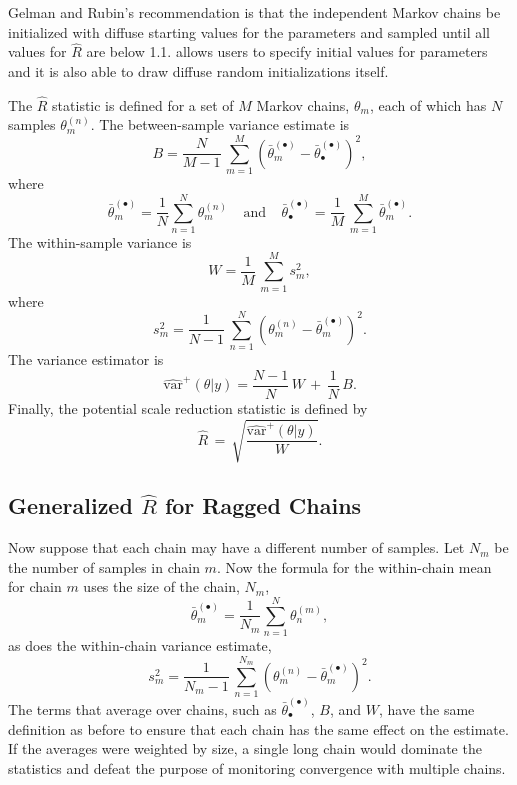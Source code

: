 Gelman and Rubin's recommendation is that the independent Markov
chains be initialized with diffuse starting values for the parameters
and sampled until all values for $\hat{R}$ are below 1.1.  \Stan
allows users to specify initial values for parameters and it is also
able to draw diffuse random initializations itself.

The $\hat{R}$ statistic is defined for a set of $M$ Markov chains,
$\theta_m$, each of which has $N$ samples $\theta^{(n)}_m$.  The
between-sample variance estimate is
\[
B
= \frac{N}{M-1} \, \sum_{m=1}^M (\bar{\theta}^{(\bullet)}_{m} - \bar{\theta}^{(\bullet)}_{\bullet})^2,
\]
%
where
%
\[
\bar{\theta}_m^{(\bullet)}
= \frac{1}{N} \sum_{n = 1}^N \theta_m^{(n)}
\ \ \ \ \
\mbox{and}
\ \ \ \ \
\bar{\theta}^{(\bullet)}_{\bullet}
= \frac{1}{M} \, \sum_{m=1}^M \bar{\theta}_m^{(\bullet)}.
\]
%
The within-sample variance is
\[
W
= \frac{1}{M} \, \sum_{m=1}^M s_m^2,
\]
where
\[
s_m^2 = \frac{1}{N-1} \, \sum_{n=1}^N (\theta^{(n)}_m - \bar{\theta}^{(\bullet)}_m)^2.
\]
%
The variance estimator is
\[
\widehat{\mbox{var}}^{+}\!(\theta|y)
= \frac{N-1}{N}\, W \, + \, \frac{1}{N} \, B.
\]
%
Finally, the potential scale reduction statistic is defined by
\[
\hat{R}
\, = \,
\sqrt{\frac{\widehat{\mbox{var}}^{+}\!(\theta|y)}{W}}.
\]

\subsection{Generalized $\hat{R}$ for Ragged Chains}

Now suppose that each chain may have a different number of samples.
Let $N_m$ be the number of samples in chain $m$.  Now the formula for
the within-chain mean for chain $m$ uses the size of the chain, $N_m$,
\[
\bar{\theta}_m^{(\bullet)}
= \frac{1}{N_m} \sum_{n = 1}^N \theta^{(m)}_n,
\]
as does the within-chain variance estimate,
\[
s_m^2 = \frac{1}{N_m-1} \, \sum_{n=1}^{N_m} (\theta^{(n)}_m - \bar{\theta}^{(\bullet)}_m)^2.
\]
The terms that average over chains, such as
$\bar{\theta}^{(\bullet)}_{\bullet}$, $B$, and $W$, have the same
definition as before to ensure that each chain has the same effect on
the estimate.  If the averages were weighted by size, a single long
chain would dominate the statistics and defeat the purpose of
monitoring convergence with multiple chains.

